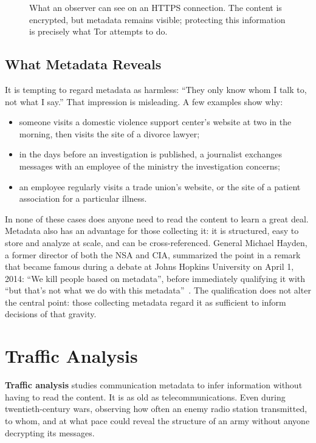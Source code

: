 \begin{figure}[htbp]
\centering

\caption{What an observer can see on an HTTPS connection. The content is encrypted, but metadata remains visible; protecting this information is precisely what Tor attempts to do.}
\label{fig:metadati}
\end{figure}

\subsection{What Metadata Reveals}

It is tempting to regard metadata as harmless: \enquote{They only know whom I talk to, not what I say.} That impression is misleading. A few examples show why:
\begin{itemize}
  \item someone visits a domestic violence support center's website at two in the morning, then visits the site of a divorce lawyer;
  \item in the days before an investigation is published, a journalist exchanges messages with an employee of the ministry the investigation concerns;
  \item an employee regularly visits a trade union's website, or the site of a patient association for a particular illness.
\end{itemize}
In none of these cases does anyone need to read the content to learn a great deal. Metadata also has an advantage for those collecting it: it is structured, easy to store and analyze at scale, and can be cross-referenced. General Michael Hayden, a former director of both the NSA and CIA, summarized the point in a remark that became famous during a debate at Johns Hopkins University on April 1, 2014: \enquote{We kill people based on metadata}, before immediately qualifying it with \enquote{but that's not what we do with this metadata}~\cite{hayden2014metadata}. The qualification does not alter the central point: those collecting metadata regard it as sufficient to inform decisions of that gravity.

\section{Traffic Analysis}\label{sec:anon-traffico}

\textbf{Traffic analysis} studies communication metadata to infer information without having to read the content. It is as old as telecommunications. Even during twentieth-century wars, observing how often an enemy radio station transmitted, to whom, and at what pace could reveal the structure of an army without anyone decrypting its messages.

